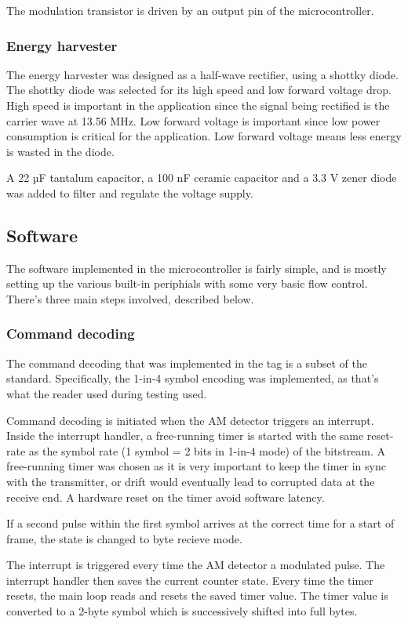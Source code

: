 The modulation transistor is driven by an output pin of the microcontroller.

\subsubsection{Energy harvester}
The energy harvester was designed as a half-wave rectifier, using a shottky diode.
The shottky diode was selected for its high speed and low forward voltage drop.
High speed is important in the application since the signal being rectified is the carrier wave at 13.56 MHz.
Low forward voltage is important since low power consumption is critical for the application.
Low forward voltage means less energy is wasted in the diode.

A 22 µF tantalum capacitor, a 100 nF ceramic capacitor and a 3.3 V zener diode was added to filter and regulate the voltage supply.

\subsection{Software}
The software implemented in the microcontroller is fairly simple, and is mostly setting up the various built-in
periphials with some very basic flow control. There's three main steps involved, described below.

\subsubsection{Command decoding}
The command decoding that was implemented in the tag is a subset of the standard. Specifically, the
1-in-4 symbol encoding was implemented, as that's what the reader used during testing used.

Command decoding is initiated when the AM detector triggers an interrupt. Inside the interrupt handler,
a free-running timer is started with the same reset-rate as the symbol rate (1 symbol = 2 bits in 1-in-4 mode)
of the bitstream. A free-running timer was chosen as it is very important to keep the timer in sync with
the transmitter, or drift would eventually lead to corrupted data at the receive end. A hardware
reset on the timer avoid software latency.

If a second pulse within the first symbol arrives at the correct time for a start of frame, the state is
changed to byte recieve mode.

The interrupt is triggered every time the AM detector a modulated pulse. The interrupt handler then
saves the current counter state. Every time the timer resets, the main loop reads and resets the saved timer
value. The timer value is converted to a 2-byte symbol which is successively shifted into full bytes.

